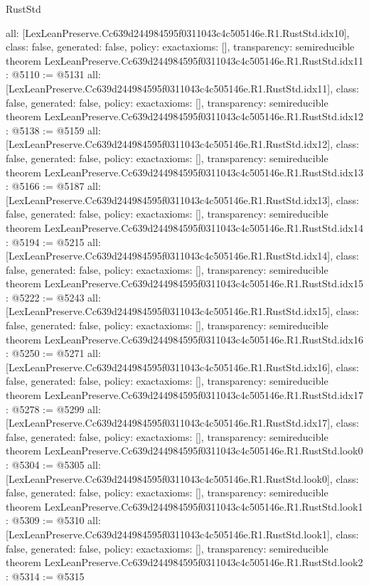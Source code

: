 \begin{lexlean}{RustStd}
\begin{coremodule}
{  all: [LexLeanPreserve.Cc639d244984595f0311043c4c505146e.R1.RustStd.idx10],
  class: false,
  generated: false,
  policy: exact{axioms: []},
  transparency: semireducible
}
theorem LexLeanPreserve.Cc639d244984595f0311043c4c505146e.R1.RustStd.idx11 : @5110 := @5131 {
  all: [LexLeanPreserve.Cc639d244984595f0311043c4c505146e.R1.RustStd.idx11],
  class: false,
  generated: false,
  policy: exact{axioms: []},
  transparency: semireducible
}
theorem LexLeanPreserve.Cc639d244984595f0311043c4c505146e.R1.RustStd.idx12 : @5138 := @5159 {
  all: [LexLeanPreserve.Cc639d244984595f0311043c4c505146e.R1.RustStd.idx12],
  class: false,
  generated: false,
  policy: exact{axioms: []},
  transparency: semireducible
}
theorem LexLeanPreserve.Cc639d244984595f0311043c4c505146e.R1.RustStd.idx13 : @5166 := @5187 {
  all: [LexLeanPreserve.Cc639d244984595f0311043c4c505146e.R1.RustStd.idx13],
  class: false,
  generated: false,
  policy: exact{axioms: []},
  transparency: semireducible
}
theorem LexLeanPreserve.Cc639d244984595f0311043c4c505146e.R1.RustStd.idx14 : @5194 := @5215 {
  all: [LexLeanPreserve.Cc639d244984595f0311043c4c505146e.R1.RustStd.idx14],
  class: false,
  generated: false,
  policy: exact{axioms: []},
  transparency: semireducible
}
theorem LexLeanPreserve.Cc639d244984595f0311043c4c505146e.R1.RustStd.idx15 : @5222 := @5243 {
  all: [LexLeanPreserve.Cc639d244984595f0311043c4c505146e.R1.RustStd.idx15],
  class: false,
  generated: false,
  policy: exact{axioms: []},
  transparency: semireducible
}
theorem LexLeanPreserve.Cc639d244984595f0311043c4c505146e.R1.RustStd.idx16 : @5250 := @5271 {
  all: [LexLeanPreserve.Cc639d244984595f0311043c4c505146e.R1.RustStd.idx16],
  class: false,
  generated: false,
  policy: exact{axioms: []},
  transparency: semireducible
}
theorem LexLeanPreserve.Cc639d244984595f0311043c4c505146e.R1.RustStd.idx17 : @5278 := @5299 {
  all: [LexLeanPreserve.Cc639d244984595f0311043c4c505146e.R1.RustStd.idx17],
  class: false,
  generated: false,
  policy: exact{axioms: []},
  transparency: semireducible
}
theorem LexLeanPreserve.Cc639d244984595f0311043c4c505146e.R1.RustStd.look0 : @5304 := @5305 {
  all: [LexLeanPreserve.Cc639d244984595f0311043c4c505146e.R1.RustStd.look0],
  class: false,
  generated: false,
  policy: exact{axioms: []},
  transparency: semireducible
}
theorem LexLeanPreserve.Cc639d244984595f0311043c4c505146e.R1.RustStd.look1 : @5309 := @5310 {
  all: [LexLeanPreserve.Cc639d244984595f0311043c4c505146e.R1.RustStd.look1],
  class: false,
  generated: false,
  policy: exact{axioms: []},
  transparency: semireducible
}
theorem LexLeanPreserve.Cc639d244984595f0311043c4c505146e.R1.RustStd.look2 : @5314 := @5315 {
}
\end{coremodule}
\end{lexlean}
